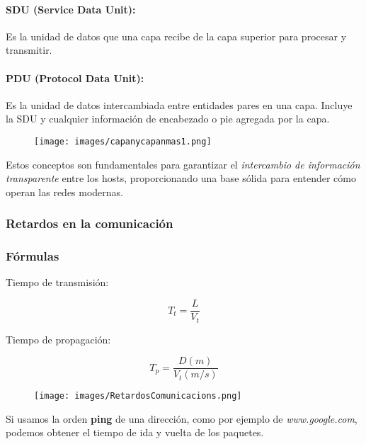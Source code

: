 \documentclass[a4paper,12pt]{article}
\begin{document}
\paragraph{SDU (Service Data Unit):}
Es la unidad de datos que una capa recibe de la capa superior para procesar y transmitir.

\paragraph{PDU (Protocol Data Unit):}
Es la unidad de datos intercambiada entre entidades pares en una capa. Incluye la SDU y cualquier información de encabezado o pie agregada por la capa.

\begin{figure}[H]
    \centering
    \texttt{[image: images/capanycapanmas1.png]}
\end{figure}

Estos conceptos son fundamentales para garantizar el \textit{intercambio de información transparente} entre los hosts, proporcionando una base sólida para entender cómo operan las redes modernas.

\subsubsection{Retardos en la comunicación}

\subsubsection*{Fórmulas}

Tiempo de transmisión:

\begin{equation}
    T_t = \frac{L}{V_t}
\end{equation}

Tiempo de propagación:

\begin{equation}
    T_p = \frac{D(m)}{V_t(m/s)}
\end{equation}

\begin{figure}[H]
    \centering
    \texttt{[image: images/RetardosComunicacions.png]}
\end{figure}


\begin{tcolorbox}[colback=green!5!white, colframe=green!75!black, title=Nota]
    Si usamos la orden \textbf{ping} de una dirección, como por ejemplo de \textit{www.google.com}, podemos obtener el tiempo de ida y vuelta de los paquetes.
\end{tcolorbox}
\end{document}
